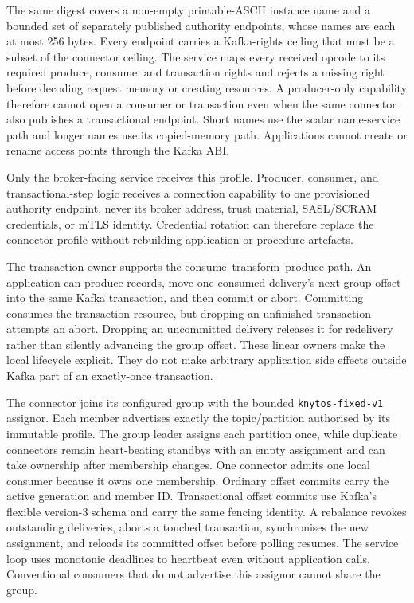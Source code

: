The same digest covers a non-empty printable-ASCII instance name and a bounded
set of separately published authority endpoints, whose names are each at most
256 bytes. Every endpoint carries a Kafka-rights ceiling that must be a subset
of the connector ceiling. The service maps every received opcode to its
required produce, consume, and transaction rights and rejects a missing right
before decoding request memory or creating resources. A producer-only
capability therefore cannot open a consumer or transaction even when the same
connector also publishes a transactional endpoint. Short names use the scalar
name-service path and longer names use its copied-memory path. Applications
cannot create or rename access points through the Kafka ABI.

Only the broker-facing service receives this profile. Producer, consumer, and
transactional-step logic receives a connection capability to one provisioned
authority endpoint, never its broker address, trust material, SASL/SCRAM
credentials, or mTLS identity. Credential rotation can therefore replace the
connector profile without rebuilding application or procedure artefacts.

The transaction owner supports the consume--transform--produce path. An
application can produce records, move one consumed delivery's next group
offset into the same Kafka transaction, and then commit or abort. Committing
consumes the transaction resource, but dropping an unfinished transaction attempts
an abort. Dropping an uncommitted delivery releases it for redelivery rather
than silently advancing the group offset. These linear owners make the local
lifecycle explicit. They do not make arbitrary application side effects outside
Kafka part of an exactly-once transaction.

The connector joins its configured group with the bounded
\texttt{knytos-fixed-v1} assignor. Each member advertises exactly the
topic/partition authorised by its immutable profile. The group leader assigns
each partition once, while duplicate connectors remain heart-beating standbys with an
empty assignment and can take ownership after membership changes. One connector
admits one local consumer because it owns one membership. Ordinary offset
commits carry the active generation and member ID. Transactional offset commits
use Kafka's flexible version-3 schema and carry the same fencing identity. A
rebalance revokes outstanding deliveries, aborts a touched transaction,
synchronises the new assignment, and reloads its committed offset before
polling resumes. The service loop uses monotonic deadlines to heartbeat even
without application calls. Conventional consumers that do not advertise this
assignor cannot share the group.

